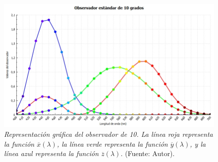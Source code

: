	\begin{figure}[H]
		\centering
		\includegraphics[scale=0.6]{img/curva-observador.jpg}
			\caption[Representaci\'{o}n gr\'{a}fica del observador de 10\degree]{\textit{Representaci\'{o}n gr\'{a}fica del observador de 10\degree. La l\'{i}nea roja representa la funci\'{o}n $\overline{x}(\lambda)$, la l\'{i}nea verde representa la funci\'{o}n $\overline{y}(\lambda)$, y la l\'{i}nea azul representa la funci\'{o}n $\overline{z}(\lambda)$.} (Fuente: Autor).}
	\end{figure}
		